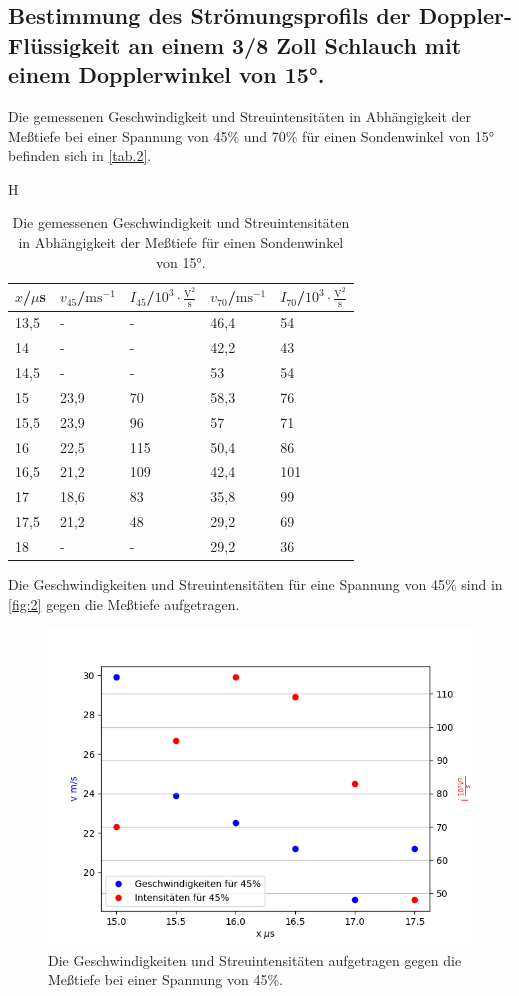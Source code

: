 \subsection{Bestimmung des Strömungsprofils der Doppler-Flüssigkeit an einem 3/8 Zoll Schlauch
mit einem Dopplerwinkel von 15°.}
Die gemessenen Geschwindigkeit und Streuintensitäten in Abhängigkeit der Meßtiefe bei einer Spannung von 45$\%$ und 70$\%$ für einen Sondenwinkel von 15° befinden sich in \autoref{tab.2}.
\begin{table}{H}
  \centering
  \caption{Die gemessenen Geschwindigkeit und Streuintensitäten in Abhängigkeit der Meßtiefe für einen Sondenwinkel von 15°.}
  \begin{tabular}{l|l|l|l|l}
    $x$/$\mu$s & $v_{45}$/$\textrm{ms}^{-1}$ & $I_{45}$/$10^3\cdot\frac{\textrm{V}^2}{\textrm{s}}$ & $v_{70}$/$\textrm{ms}^{-1}$ & $I_{70}$/$10^3\cdot\frac{\textrm{V}^2}{\textrm{s}}$\\ \hline
    13,5 & - & - & 46,4 & 54\\
    14 & - & - & 42,2 & 43\\
    14,5 & - & - & 53 & 54\\
    15 & 23,9 & 70 & 58,3 & 76\\
    15,5 & 23,9 & 96 & 57 & 71\\
    16 & 22,5 & 115 & 50,4 & 86\\
    16,5 & 21,2 & 109 & 42,4 & 101\\
    17 & 18,6 & 83 & 35,8 & 99\\
    17,5 & 21,2 & 48 & 29,2 & 69\\
    18 & - & - & 29,2 & 36\\
    \end{tabular}
  \label{tab.2}
\end{table}
Die Geschwindigkeiten und Streuintensitäten für eine Spannung von 45$\%$ sind in \autoref{fig:2} gegen die Meßtiefe aufgetragen.
\begin{figure}[H]
  \centering
  \includegraphics[width=12cm]{content/2}
  \caption{Die Geschwindigkeiten und Streuintensitäten aufgetragen gegen die Meßtiefe bei einer Spannung von 45$\%$.}
  \label{fig:2}
\end{figure}
